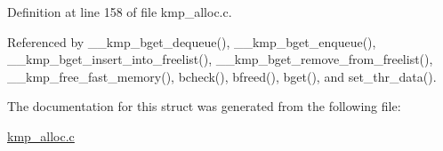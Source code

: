 Definition at line 158 of file kmp\-\_\-alloc.\-c.



Referenced by \-\_\-\-\_\-kmp\-\_\-bget\-\_\-dequeue(), \-\_\-\-\_\-kmp\-\_\-bget\-\_\-enqueue(), \-\_\-\-\_\-kmp\-\_\-bget\-\_\-insert\-\_\-into\-\_\-freelist(), \-\_\-\-\_\-kmp\-\_\-bget\-\_\-remove\-\_\-from\-\_\-freelist(), \-\_\-\-\_\-kmp\-\_\-free\-\_\-fast\-\_\-memory(), bcheck(), bfreed(), bget(), and set\-\_\-thr\-\_\-data().



The documentation for this struct was generated from the following file\-:\begin{DoxyCompactItemize}
\item 
\hyperlink{kmp__alloc_8c}{kmp\-\_\-alloc.\-c}\end{DoxyCompactItemize}

